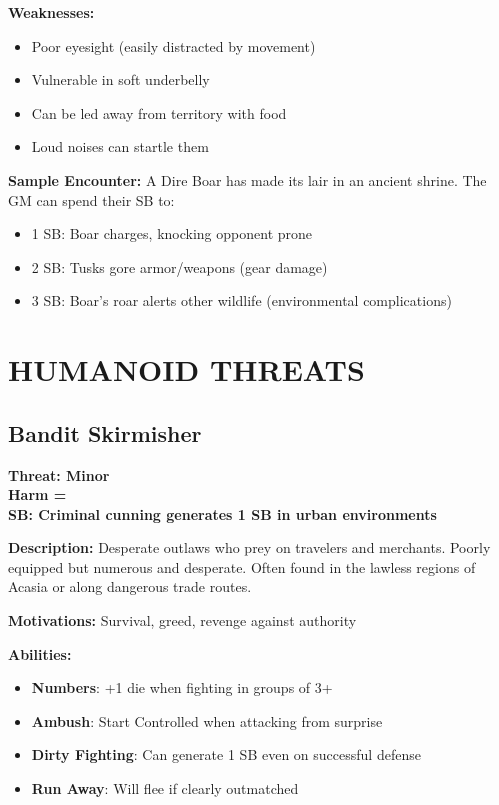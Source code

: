 \documentclass[12pt]{article}
\newcommand{\cp}[1]{\textbf{SB: #1}}
\newcommand{\harm}[1]{\textbf{Harm #1}}
\newcommand{\threat}[1]{\textbf{Threat: #1}}
\begin{document}
\textbf{Weaknesses:}
\begin{itemize}
\item Poor eyesight (easily distracted by movement)
\item Vulnerable in soft underbelly
\item Can be led away from territory with food
\item Loud noises can startle them
\end{itemize}

\textbf{Sample Encounter:}
A Dire Boar has made its lair in an ancient shrine. The GM can spend their SB to:
\begin{itemize}
\item 1 SB: Boar charges, knocking opponent prone
\item 2 SB: Tusks gore armor/weapons (gear damage)
\item 3 SB: Boar's roar alerts other wildlife (environmental complications)
\end{itemize}

\section{HUMANOID THREATS}

\subsection*{Bandit Skirmisher}

\threat{Minor} \\
\harm{=} \\
\cp{Criminal cunning generates 1 SB in urban environments}

\vspace{0.5em}
\textbf{Description:} Desperate outlaws who prey on travelers and merchants. Poorly equipped but numerous and desperate. Often found in the lawless regions of Acasia or along dangerous trade routes.

\textbf{Motivations:} Survival, greed, revenge against authority

\textbf{Abilities:}
\begin{itemize}
\item \textbf{Numbers}: +1 die when fighting in groups of 3+
\item \textbf{Ambush}: Start Controlled when attacking from surprise
\item \textbf{Dirty Fighting}: Can generate 1 SB even on successful defense
\item \textbf{Run Away}: Will flee if clearly outmatched
\end{itemize}
\end{document}
